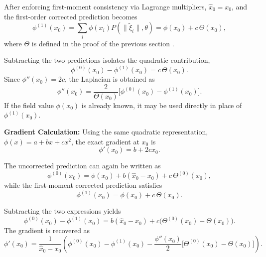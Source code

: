 \documentclass{article} %
\theoremstyle{plain}
\begin{document}
After enforcing first-moment consistency via Lagrange multipliers,
$\hat{x}_0=x_0$, and the first-order corrected prediction becomes
\begin{equation}
\phi^{(1)}(x_0)
=
\sum_i \phi(x_i) P(\|\tilde{\xi}_i\|,\theta)
=
\phi(x_0)+c\,\Theta(x_0),
\end{equation}
where $\Theta$ is defined in the proof of the previous section  .

Subtracting the two predictions isolates the quadratic contribution,
\begin{equation}
\phi^{(0)}(x_0)-\phi^{(1)}(x_0)=c\,\Theta(x_0).
\end{equation}
Since $\phi''(x_0)=2c$, the Laplacian is obtained as
\begin{equation}
\phi''(x_0)
=
\frac{2}{\Theta(x_0)}
\bigl[\phi^{(0)}(x_0)-\phi^{(1)}(x_0)\bigr].
\end{equation}
If the field value $\phi(x_0)$ is already known, it may be used directly in
place of $\phi^{(1)}(x_0)$.

\medskip
\textbf{Gradient Calculation:}
Using the same quadratic representation,
$\phi(x)=a+bx+cx^2$, the exact gradient at $x_0$ is
\begin{equation}
\phi'(x_0)=b+2cx_0.
\end{equation}

The uncorrected prediction can again be written as
\begin{equation}
\phi^{(0)}(x_0)
=
\phi(x_0)
+
b(\hat{x}_0-x_0)
+
c\,\Theta^{(0)}(x_0),
\end{equation}
while the first-moment corrected prediction satisfies
\begin{equation}
\phi^{(1)}(x_0)=\phi(x_0)+c\,\Theta(x_0).
\end{equation}

Subtracting the two expressions yields
\begin{equation}
\phi^{(0)}(x_0)-\phi^{(1)}(x_0)
=
b(\hat{x}_0-x_0)
+
c\bigl(\Theta^{(0)}(x_0)-\Theta(x_0)\bigr).
\end{equation}
The gradient is recovered as
\begin{equation}
\phi'(x_0)
=
\frac{1}
{\hat{x}_0-x_0} \left(\phi^{(0)}(x_0)-\phi^{(1)}(x_0)
-
\frac{\phi''(x_0)}{2}
\bigl[\Theta^{(0)}(x_0)-\Theta(x_0)\bigr]\right).
\end{equation}
\end{document}
